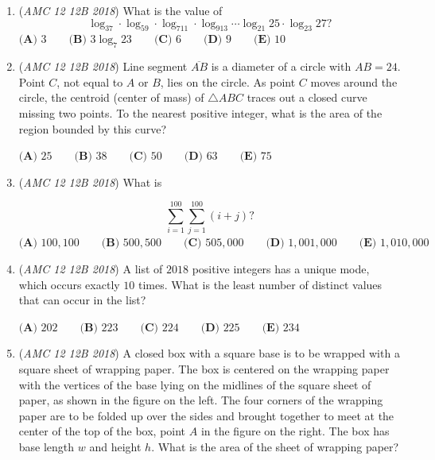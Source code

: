 \begin{enumerate}
 $\textbf{(A) } \frac{4DQ}{S} \qquad \textbf{(B) } \frac{4DS}{Q} \qquad \textbf{(C) } \frac{4Q}{DS} \qquad \textbf{(D) } \frac{DQ}{4S} \qquad \textbf{(E) } \frac{DS}{4Q}$


	\item (\textit{AMC 12 12B 2018}) What is the value of 
 \[\log_37\cdot\log_59\cdot\log_711\cdot\log_913\cdots\log_{21}25\cdot\log_{23}27?\]
$\textbf{(A) } 3 \qquad \textbf{(B) } 3\log_{7}23 \qquad \textbf{(C) } 6 \qquad \textbf{(D) } 9 \qquad \textbf{(E) } 10$


	\item (\textit{AMC 12 12B 2018}) Line segment $\overline{AB}$ is a diameter of a circle with $AB = 24$. Point $C$, not equal to $A$ or $B$, lies on the circle. As point $C$ moves around the circle, the centroid (center of mass) of $\triangle ABC$ traces out a closed curve missing two points. To the nearest positive integer, what is the area of the region bounded by this curve?


 $\textbf{(A) } 25 \qquad \textbf{(B) } 38  \qquad \textbf{(C) } 50  \qquad \textbf{(D) } 63 \qquad \textbf{(E) } 75$


	\item (\textit{AMC 12 12B 2018}) What is

 \[\sum^{100}_{i=1} \sum^{100}_{j=1} (i+j) ?\]
$\textbf{(A) }100{,}100 \qquad \textbf{(B) }500{,}500\qquad \textbf{(C) }505{,}000 \qquad \textbf{(D) }1{,}001{,}000 \qquad \textbf{(E) }1{,}010{,}000 \qquad$


	\item (\textit{AMC 12 12B 2018}) A list of $2018$ positive integers has a unique mode, which occurs exactly $10$ times. What is the least number of distinct values that can occur in the list?


 $\textbf{(A) }202 \qquad \textbf{(B) }223 \qquad \textbf{(C) }224 \qquad \textbf{(D) }225 \qquad \textbf{(E) }234 \qquad$


	\item (\textit{AMC 12 12B 2018}) A closed box with a square base is to be wrapped with a square sheet of wrapping paper. The box is centered on the wrapping paper with the vertices of the base lying on the midlines of the square sheet of paper, as shown in the figure on the left. The four corners of the wrapping paper are to be folded up over the sides and brought together to meet at the center of the top of the box, point $A$ in the figure on the right. The box has base length $w$ and height $h$. What is the area of the sheet of wrapping paper?



\end{enumerate}
